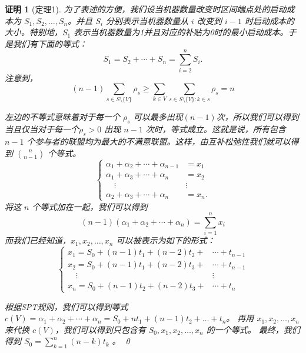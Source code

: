 \documentclass[UTF8]{article}
\newtheorem{pf}{\hspace{2em}证明}
\begin{document}
\begin{pf}[定理1]

为了表述的方便，我们设当机器数量改变时区间端点处的启动成本为 $S_{1},S_{2}, \dots ,S_{n}$。并且 $S_{i}$ 分别表示当机器数量从 $i$ 改变到 $i-1$ 时启动成本的大小。特别地，$S_{1}$ 表示当机器数量为1并且对应的补贴为0时的最小启动成本。于是我们有下面的等式：
\begin{displaymath}
  S_{1}=S_{2}+\cdots+S_{n}=\sum_{i=2}^n S_i.
\end{displaymath}
注意到，
\begin{displaymath}
  (n-1) \sum_{s \in S \setminus\{V\} } \rho_s \geq
  \sum_{k\in V}\sum_{s \in S \setminus\{V\}:k \in s} \rho_s = n
\end{displaymath}

左边的不等式意味着对于每一个 $\rho_s$ 可以最多出现$(n-1)$次，所以我们可以得到当且仅当对于每一个$\rho_s > 0$ 出现 $n-1$ 次时，等式成立。这就是说，所有包含 $n-1$ 个参与者的联盟均为最大的不满意联盟。这样，由互补松弛性我们就可以得到 $n \choose n-1$ 个等式。
\[
\begin{cases}
 \alpha_1+\alpha_2+ \cdots+\alpha_{n-1} & = x_1 \\
 \alpha_1+\alpha_3+ \cdots+\alpha_n & = x_2 \\
 \quad   \vdots        &\vdots\\
 \alpha_2+\alpha_3+ \cdots+\alpha_n & = x_n.
\end{cases}
\]
将这 $n$ 个等式加在一起，我们可以得到
\begin{equation*}
  (n-1)(\alpha_1+\alpha_2+ \cdots+\alpha_n)=\sum_{i=1}^{n}x_i
\end{equation*}
而我们已经知道，$x_1,x_2,\dots,x_n$ 可以被表示为如下的形式：
\[
\begin{cases}
x_1 = S_0 + (n-1)t_1 + (n-2)t_2 + &\cdots + t_{n-1} \\
x_2 = S_0 + (n-1)t_1 + (n-2)t_3 + &\cdots + t_{n-1} \\
\quad   \vdots        &\vdots\\
x_n = S_0 + (n-1)t_2 + (n-2)t_3 + &\cdots + t_{n}
\end{cases}
\]

根据SPT规则，我们可以得到等式 $c(V)=\alpha_1+\alpha_2+\cdots+\alpha_n=S_0+nt_1+(n-1)t_2+\dots+t_n$。
再用 $x_1,x_2,\dots,x_n$ 来代换 $c(V)$，我们可以得到只包含有 $S_0,x_1,x_2,\dots,x_n$ 的一个等式。
最终，我们得到 $S_0 = \sum_{k=1}^n (n-k)t_k$ 。
\qed
\end{pf}
\end{document}
